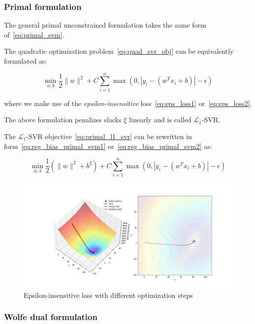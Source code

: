 \subsubsection{Primal formulation}

The general primal unconstrained formulation takes the same form of~\eqref{eq:primal_svm}.

The quadratic optimization problem~\eqref{eq:quad_svr_obj} can be equivalently formulated as:

\begin{equation} \label{eq:primal_l1_svr}
	\min_{w,b} \frac{1}{2} \| w \|^2 + C \sum_{i=1}^n \max(0, |y_i - (w^T x_i + b)| - \epsilon)
\end{equation}

where we make use of the \emph{epsilon-insensitive} loss~\eqref{eq:eps_loss1} or~\eqref{eq:eps_loss2}.

The above formulation penalizes slacks $\xi$ linearly and is called $\mathcal{L}_1$-SVR.

The $\mathcal{L}_1$-SVR objective~\eqref{eq:primal_l1_svr} can be rewritten in form~\eqref{eq:reg_bias_primal_svm1} or~\eqref{eq:reg_bias_primal_svm2} as:

\begin{equation} \label{eq:reg_bias_primal_l1_svr}
	\min_{w,b} \frac{1}{2} (\| w \|^2 + b^2) + C \sum_{i=1}^n \max(0, |y_i - (w^T x_i + b)| - \epsilon)
\end{equation}

\begin{figure}[h!]
	\centering
  	\includegraphics[scale=0.4]{img/l1_svr_loss}
  	\caption{Epsilon-insensitive loss with different optimization steps}
  	\label{fig:l1_svr_loss}
\end{figure}

\subsubsection{Wolfe dual formulation}

